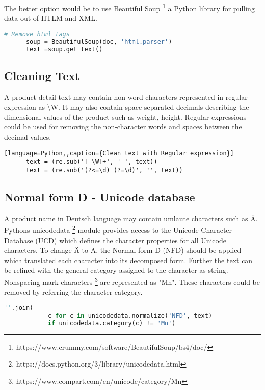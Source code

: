 The better option would be to use Beautiful Soup \footnote{https://www.crummy.com/software/BeautifulSoup/bs4/doc/} a Python library for pulling data out of HTLM and XML.
\begin{lstlisting}[language=Python, caption={Beautiful soap API to get text from html}]
      # Remove html tags 
      soup = BeautifulSoup(doc, 'html.parser')
      text =soup.get_text()
\end{lstlisting}

\subsection{Cleaning Text}
A product detail text may contain non-word characters represented in regular expression as \textbackslash W. It may also contain space separated decimals describing the dimensional values of the product such as weight, height. Regular expressions could be used for removing the non-character words and spaces between the decimal values. 

\begin{lstlisting}[language=Python,,caption={Clean text with Regular expression}]
      text = (re.sub('[-\W]+', ' ', text))
      text = (re.sub('(?<=\d) (?=\d)', '', text))
\end{lstlisting}

\subsection{Normal form D - Unicode database}

A product name in Deutsch language may contain umlaute characters such as \"A.  Pythons unicodedata \footnote{https://docs.python.org/3/library/unicodedata.html} module provides access to the Unicode Character Database (UCD) which defines the character properties for all Unicode characters. To change \"A to A, the Normal form D (NFD) should be applied which translated each character into its decomposed form. Further the text can be refined with the general category assigned to the character as string. Nonspacing mark characters \footnote{https://www.compart.com/en/unicode/category/Mn} are represented as "Mn". These characters could be removed by referring the character category.
\begin{lstlisting}[language=Python ,caption={NFD normalization}]
      ''.join(
            c for c in unicodedata.normalize('NFD', text)
            if unicodedata.category(c) != 'Mn')
\end{lstlisting}

